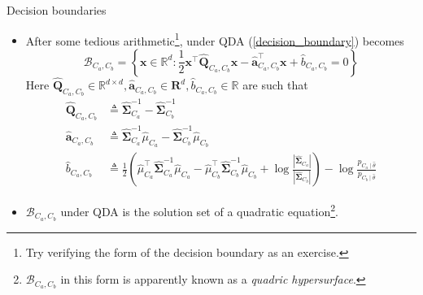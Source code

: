 \documentclass{beamer}
\numberwithin{equation}{section}
\newcommand{\aref}[1]{\alert{\ref{#1}}}
\begin{document}
\begin{frame}{Decision boundaries}
    \begin{itemize}
        \item
        After some tedious arithmetic\footnote{
            Try verifying the form of the decision boundary as an exercise.      
        }, under QDA (\aref{decision_boundary})
        becomes
        \begin{equation} \label{qda_decision_boundary}
            \mathcal{B}_{C_a, C_b} = \left\{
                \mathbf{x} \in \mathbb{R}^d : \frac{1}{2}
                \mathbf{x}^\top\hat{\mathbf{Q}}_{C_a, C_b}\mathbf{x} -
                \hat{\mathbf{a}}_{C_a, C_b}^\top\mathbf{x} +
                \hat{b}_{C_a, C_b} = 0
            \right\}
        \end{equation}
        Here $ \hat{\mathbf{Q}}_{C_a, C_b} \in \mathbb{R}^{d \times d},
        \hat{\mathbf{a}}_{C_a, C_b} \in \mathbf{R}^d, \hat{b}_{C_a, C_b} \in
        \mathbb{R} $ are such that
        \begin{equation*}%
            \begin{split}
            \hat{\mathbf{Q}}_{C_a, C_b} & \triangleq
                \hat{\mathbf{\Sigma}}_{C_a}^{-1} -
                \hat{\mathbf{\Sigma}}_{C_b}^{-1} \\
            \hat{\mathbf{a}}_{C_a, C_b} & \triangleq
                \hat{\mathbf{\Sigma}}_{C_a}^{-1}\hat{\mu}_{C_a} -
                \hat{\mathbf{\Sigma}}_{C_b}^{-1}\hat{\mu}_{C_b} \\
            \hat{b}_{C_a, C_b} & \triangleq
                \frac{1}{2}\left(
                    \hat{\mu}_{C_a}^\top
                    \hat{\mathbf{\Sigma}}_{C_a}^{-1}\hat{\mu}_{C_a} -
                    \hat{\mu}_{C_b}^\top
                    \hat{\mathbf{\Sigma}}_{C_b}^{-1}\hat{\mu}_{C_b} +
                    \log\frac{
                        |\hat{\mathbf{\Sigma}}_{C_a}|
                    }{|\hat{\mathbf{\Sigma}}_{C_b}|}
                \right) - \log\frac{p_{C_a \mid \hat{\theta}}}{
                    p_{C_b \mid \hat{\theta}}
                }
            \end{split}
        \end{equation*}

        \vspace{-5 pt}

        \item
        $ \mathcal{B}_{C_a, C_b} $ under QDA is the solution set of a
        quadratic equation\footnote{
            $ \mathcal{B}_{C_a, C_b} $ in this form is apparently known as a
            \textit{quadric hypersurface}.        
        }.
    \end{itemize}

    \medskip
\end{frame}
\end{document}
